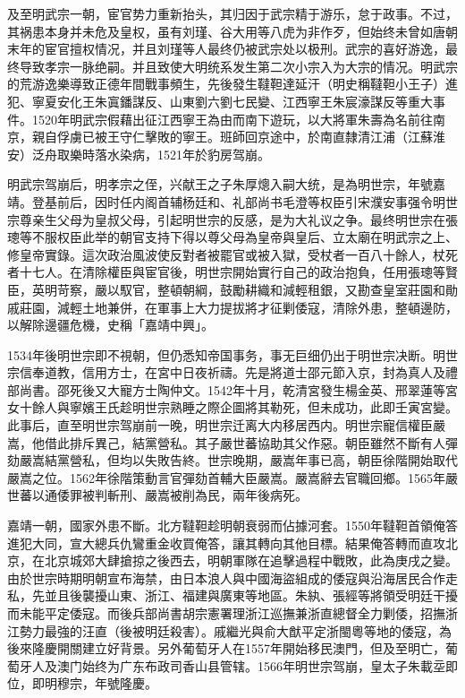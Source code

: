 及至明武宗一朝，宦官势力重新抬头，其归因于武宗精于游乐，怠于政事。不过，其祸患本身并未危及皇权，虽有刘瑾、谷大用等八虎为非作歹，但始终未曾如唐朝末年的宦官擅权情况，并且刘瑾等人最终仍被武宗处以极刑。武宗的喜好游逸，最终导致孝宗一脉绝嗣。并且致使大明统系发生第二次小宗入为大宗的情况。明武宗的荒游逸樂導致正德年間戰事頻生，先後發生韃靼達延汗（明史稱韃靼小王子）進犯、寧夏安化王朱寘鐇謀反、山東劉六劉七民變、江西寧王朱宸濠謀反等重大事件。1520年明武宗假藉出征江西寧王為由而南下遊玩，以大將軍朱壽為名前往南京，親自俘虜已被王守仁擊敗的寧王。班師回京途中，於南直隸清江浦（江蘇淮安）泛舟取樂時落水染病，1521年於豹房驾崩。

明武宗驾崩后，明孝宗之侄，兴献王之子朱厚熜入嗣大统，是為明世宗，年號嘉靖。登基前后，因时任内阁首辅杨廷和、礼部尚书毛澄等权臣引宋濮安事强令明世宗尊亲生父母为皇叔父母，引起明世宗的反感，是为大礼议之争。最终明世宗在張璁等不服权臣此举的朝官支持下得以尊父母為皇帝與皇后、立太廟在明武宗之上、修皇帝實錄。這次政治風波使反對者被罷官或被入獄，受杖者一百八十餘人，杖死者十七人。在清除權臣與宦官後，明世宗開始實行自己的政治抱負，任用張璁等賢臣，英明苛察，嚴以馭官，整頓朝綱，鼓勵耕織和減輕租銀，又勘查皇室莊園和勛戚莊園，減輕土地兼併，在軍事上大力提拔將才征剿倭寇，清除外患，整頓邊防，以解除邊疆危機，史稱「嘉靖中興」。

1534年後明世宗即不視朝，但仍悉知帝国事务，事无巨细仍出于明世宗决断。明世宗信奉道教，信用方士，在宮中日夜祈禱。先是將道士邵元節入京，封為真人及禮部尚書。邵死後又大寵方士陶仲文。1542年十月，乾清宮發生楊金英、邢翠蓮等宮女十餘人與寧嬪王氏趁明世宗熟睡之際企圖將其勒死，但未成功，此即壬寅宮變。此事后，直至明世宗驾崩前一晚，明世宗迁离大内移居西内。明世宗寵信權臣嚴嵩，他借此排斥異己，結黨營私。其子嚴世蕃協助其父作惡。朝臣雖然不斷有人彈劾嚴嵩結黨營私，但均以失敗告終。世宗晚期，嚴嵩年事已高，朝臣徐階開始取代嚴嵩之位。1562年徐階策動言官彈劾首輔大臣嚴嵩。嚴嵩辭去官職回鄉。1565年嚴世蕃以通倭罪被判斬刑、嚴嵩被削為民，兩年後病死。

嘉靖一朝，國家外患不斷。北方韃靼趁明朝衰弱而佔據河套。1550年韃靼首領俺答進犯大同，宣大總兵仇鸞重金收買俺答，讓其轉向其他目標。結果俺答轉而直攻北京，在北京城郊大肆搶掠之後西去，明朝軍隊在追擊過程中戰敗，此為庚戌之變。由於世宗時期明朝宣布海禁，由日本浪人與中國海盜組成的倭寇與沿海居民合作走私，先並且後襲擾山東、浙江、福建與廣東等地區。朱紈、張經等將領受明廷干擾而未能平定倭寇。而後兵部尚書胡宗憲署理浙江巡撫兼浙直總督全力剿倭，招撫浙江勢力最強的汪直（後被明廷殺害）。戚繼光與俞大猷平定浙閩粵等地的倭寇，為後來隆慶開關建立好背景。另外葡萄牙人在1557年開始移民澳門，但及至明亡，葡萄牙人及澳门始终为广东布政司香山县管辖。1566年明世宗驾崩，皇太子朱載坖即位，即明穆宗，年號隆慶。


